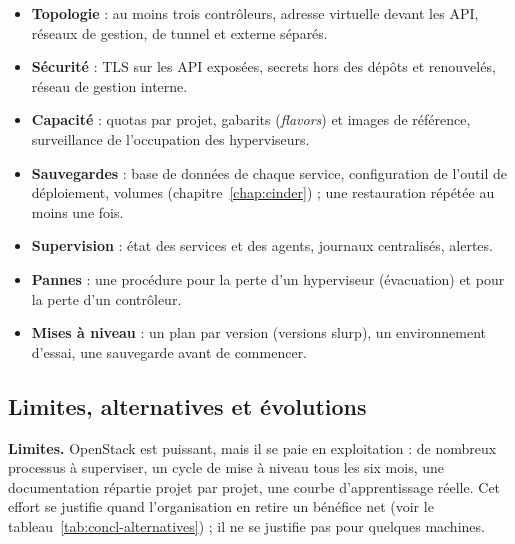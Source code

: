 \begin{itemize}
  \item \textbf{Topologie} : au moins trois contrôleurs, adresse virtuelle devant les API, réseaux de gestion, de tunnel et externe
        séparés.
  \item \textbf{Sécurité} : TLS sur les API exposées, secrets hors des dépôts et renouvelés, réseau de gestion interne.
  \item \textbf{Capacité} : \glspl{quota} par projet, gabarits (\emph{flavors}) et images de référence, surveillance de l'occupation des
        hyperviseurs.
  \item \textbf{Sauvegardes} : base de données de chaque service, configuration de l'outil de déploiement, volumes
        (chapitre~\ref{chap:cinder}) ; une restauration répétée au moins une fois.
  \item \textbf{Supervision} : état des services et des agents, journaux centralisés, alertes.
  \item \textbf{Pannes} : une procédure pour la perte d'un hyperviseur (évacuation) et pour la perte d'un contrôleur.
  \item \textbf{Mises à niveau} : un plan par version (versions \gls{slurp}), un environnement d'essai, une sauvegarde avant de
        commencer.
\end{itemize}

\subsection*{Limites, alternatives et évolutions}

\textbf{Limites.} OpenStack est puissant, mais il se paie en exploitation : de nombreux processus à superviser, un cycle de mise à
niveau tous les six mois, une documentation répartie projet par projet, une courbe d'apprentissage réelle. Cet effort se justifie
quand l'organisation en retire un bénéfice net (voir le tableau~\ref{tab:concl-alternatives}) ; il ne se justifie pas pour quelques
machines.

